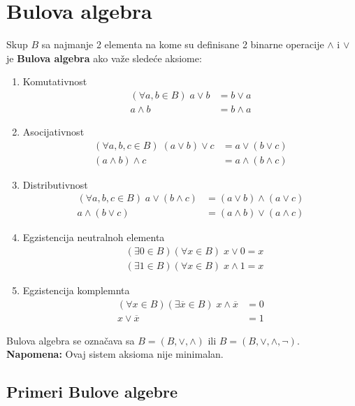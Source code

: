 \section{Bulova algebra}
\begin{definition}
	Skup $B$ sa najmanje 2 elementa na kome su definisane 2 binarne operacije $\land$ i $\lor$ je \textbf{Bulova algebra} ako važe sledeće aksiome:
	\begin{enumerate}[label=$B_{\arabic *}$: ]
		\item 
			Komutativnost 
			\begin{align*}
				(\forall a, b \in B) \; a\lor b &= b \lor a\\
				a\land b &= b\land a
			\end{align*}
		\item
			Asocijativnost
			\begin{align*}
				(\forall a, b, c \in B) \; (a\lor b) \lor c &= a\lor (b\lor c)\\
				(a\land b)\land c &= a \land (b\land c)
			\end{align*}
		\item
			Distributivnost
			\begin{align*}
				(\forall a, b, c \in B) \; a\lor (b\land c) &= (a\lor b)\land (a\lor c)\\
				a\land (b \lor c) &= (a \land b) \lor (a \land c)
			\end{align*}
		\item
			Egzistencija neutralnoh elementa
			\begin{align*}
				&(\exists 0 \in B)(\forall x \in B) \; x\lor 0 = x\\
				&(\exists 1 \in B)(\forall x \in B) \; x\land 1 = x
			\end{align*}
		\item
			Egzistencija komplemnta
			\begin{align*}
				(\forall x \in B)(\exists \overline{x} \in B)\; x\land \overline{x} &= 0\\
				x \lor \overline{x} &= 1
			\end{align*}
	\end{enumerate}
	Bulova algebra se označava sa $B=(B, \lor, \land)$ ili $B = (B, \lor, \land, \neg)$.\\
	\textbf{Napomena:} Ovaj sistem aksioma nije minimalan.
\end{definition}

\subsection{Primeri Bulove algebre}

